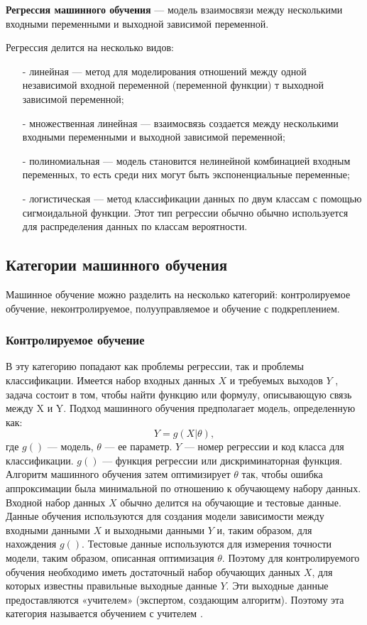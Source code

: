 \textbf{Регрессия машинного обучения} --- модель взаимосвязи между несколькими входными переменными и выходной зависимой переменной.

Регрессия делится на несколько видов:
\begin{itemize}
	\item[-] линейная --- метод для моделирования отношений между одной независимой входной переменной (переменной функции) т выходной зависимой переменной;
	\item[-] множественная линейная --- взаимосвязь создается между несколькими входными переменными и выходной зависимой переменной;
	\item[-] полиномиальная --- модель становится нелинейной комбинацией входным переменных, то есть среди них могут быть экспоненциальные переменные;
	\item[-] логистическая --- метод классификации данных по двум классам с помощью сигмоидальной функции. Этот тип регрессии обычно обычно используется для распределения данных по классам вероятности.
\end{itemize}

\subsection*{Категории машинного обучения}

Машинное обучение можно разделить на несколько категорий: контролируемое обучение, неконтролируемое, полууправляемое и обучение с подкреплением.

\subsubsection*{Контролируемое обучение}

В эту категорию попадают как проблемы регрессии, так и проблемы классификации. Имеется набор входных данных $X$ и требуемых выходов $Y$ , задача состоит в том, чтобы найти функцию или формулу, описывающую связь между X и Y. Подход машинного обучения предполагает модель, определенную как:
\begin{equation}
	Y = g(X | \theta),
\end{equation}
где $g()$ — модель, $\theta$ — ее параметр. $Y$ — номер регрессии и код класса для классификации. $g()$ — функция регрессии или дискриминаторная функция. Алгоритм машинного обучения затем оптимизирует $\theta$ так, чтобы ошибка аппроксимации была минимальной по отношению к обучающему набору данных. Входной набор данных $X$ обычно делится на обучающие и тестовые данные. Данные обучения используются для создания модели зависимости между входными данными $X$ и выходными данными $Y$ и, таким образом, для нахождения $g()$. Тестовые данные используются для измерения точности модели, таким образом, описанная оптимизация $\theta$. Поэтому для контролируемого обучения необходимо иметь достаточный набор обучающих данных $X$, для которых известны правильные выходные данные $Y$. Эти выходные данные предоставляются «учителем» (экспертом, создающим алгоритм). Поэтому эта категория называется обучением с учителем \cite{artificialintel}.

